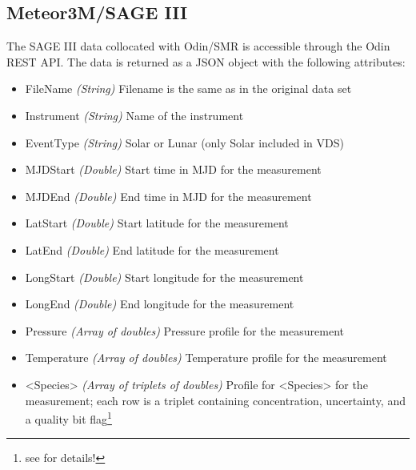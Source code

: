 \subsection{Meteor3M/SAGE III}
The SAGE III data collocated with Odin/SMR is accessible through the Odin REST
API. The data is returned as a JSON object with the following attributes:
\begin{itemize}
    \item FileName    \emph{(String)} Filename is the same as in the original
        data set \\
    \item Instrument  \emph{(String)} Name of the instrument \\
    \item EventType   \emph{(String)} Solar or Lunar (only Solar included in
        VDS) \\
    \item MJDStart    \emph{(Double)} Start time in MJD for the measurement \\
    \item MJDEnd      \emph{(Double)} End time in MJD for the measurement \\
    \item LatStart    \emph{(Double)} Start latitude for the measurement \\
    \item LatEnd      \emph{(Double)} End latitude for the measurement \\
    \item LongStart   \emph{(Double)} Start longitude for the measurement \\
    \item LongEnd     \emph{(Double)} End longitude for the measurement \\
    \item Pressure    \emph{(Array of doubles)} Pressure profile for the
        measurement \\
    \item Temperature \emph{(Array of doubles)} Temperature profile for the
        measurement \\
    \item <Species>   \emph{(Array of triplets of doubles)} Profile for
        <Species> for the measurement; each row is a triplet containing
        concentration, uncertainty, and a quality bit
        flag\footnote{see \cite{SAGEIII_DPUG} for details!} \\
\end{itemize}




